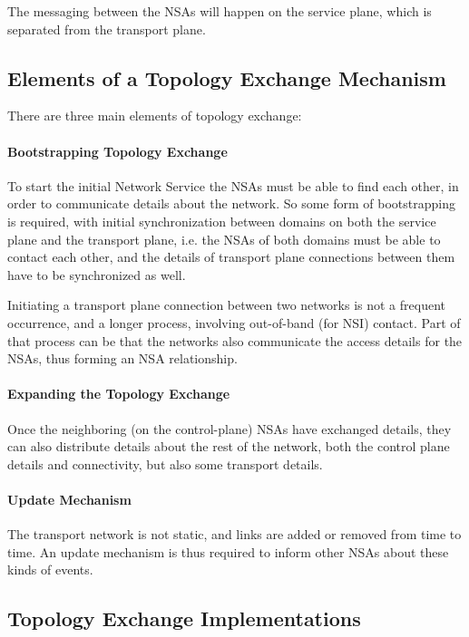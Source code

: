 \documentclass[12pt]{article}  %
\begin{document}
The messaging between the NSAs will happen on the 
service plane, which is separated from the transport plane.


\subsection{Elements of a Topology Exchange Mechanism}

 There are three main elements of topology exchange: 


\paragraph{Bootstrapping Topology Exchange}

 To start the initial Network Service the NSAs must be able to 
find each other, in order to communicate details about the network. So some form 
of bootstrapping is required, with initial synchronization between domains on both 
the service plane and the transport plane, i.e. the NSAs of both domains must be 
able to contact each other, and the details of transport plane connections between 
them have to be synchronized as well.


Initiating a transport plane connection between two 
networks is not a frequent occurrence, and a longer process, involving out-of-band 
(for NSI) contact. Part of that process can be that the networks also communicate 
the access details for the NSAs, thus forming an NSA relationship.


\paragraph{Expanding the Topology Exchange}

 Once the neighboring (on the control-plane) NSAs have exchanged 
details, they can also distribute details about the rest of the network, both the 
control plane details and connectivity, but also some transport details.

\paragraph{Update Mechanism}

 The transport network is not static, and links are added or removed 
from time to time. An update mechanism is thus required to inform other NSAs about 
these kinds of events.


\subsection{Topology Exchange Implementations}
\end{document}
